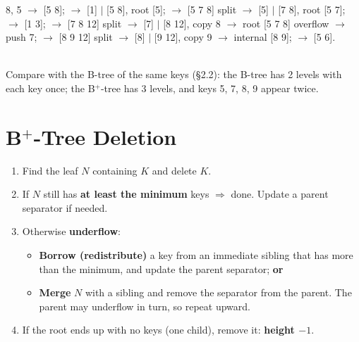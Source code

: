 \documentclass[10pt,a4paper]{article}
\newcommand{\sep}{\,$\mid$\,}
\begin{document}
\begin{exbox}
\small
8, 5 $\to$ [5 8];  $\to$ [1] $\mid$ [5 8], root [5];  $\to$ [5 7 8] split $\to$ [5] $\mid$ [7 8], root [5 7];  $\to$ [1 3]; $\to$ [7 8 12] split $\to$ [7] $\mid$ [8 12], copy 8 $\to$ root [5 7 8] overflow $\to$ push 7; $\to$ [8 9 12] split $\to$ [8] $\mid$ [9 12], copy 9 $\to$ internal [8 9];  $\to$ [5 6].

\centering
{}\\
{\scriptsize Compare with the B-tree of the same keys (\S2.2): the B-tree has 2 levels with each key once; the B$^+$-tree has 3 levels, and keys 5, 7, 8, 9 appear twice.}
\end{exbox}

\section{B$^+$-Tree Deletion}

\begin{keybox}[Algorithm]
\begin{enumerate}
  \item Find the leaf $N$ containing $K$ and delete $K$.
  \item If $N$ still has \textbf{at least the minimum} keys $\Rightarrow$ done. Update a parent separator if needed.
  \item Otherwise \textbf{underflow}:
    \begin{itemize}
      \item \textbf{Borrow (redistribute)} a key from an immediate sibling that has more than the minimum, and update the parent separator; \textbf{or}
      \item \textbf{Merge} $N$ with a sibling and remove the separator from the parent. The parent may underflow in turn, so repeat upward.
    \end{itemize}
  \item If the root ends up with no keys (one child), remove it: \textbf{height $-1$}.
\end{enumerate}
\end{keybox}
\end{document}
